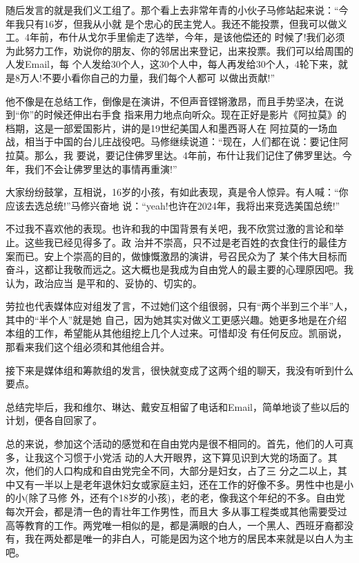 ﻿\documentclass[11pt]{article}
\begin{document}
随后发言的就是我们义工组了。那个看上去非常年青的小伙子马修站起来说：``今年我只有16岁，但我从小就
是个忠心的民主党人。我还不能投票，但我可以做义工。4年前，布什从戈尔手里偷走了选举，今年，是该他偿还的
时候了!我们必须为此努力工作，劝说你的朋友、你的邻居出来登记，出来投票。我们可以给周围的人发Email，每
个人发给30个人，这30个人中，每人再发给30个人，4轮下来，就是8万人!不要小看你自己的力量，我们每个人都可
以做出贡献!''

他不像是在总结工作，倒像是在演讲，不但声音铿锵激昂，而且手势坚决，在说到``你''的时候还伸出右手食
指来用力地点向听众。现在正好是影片《阿拉莫》的档期，这是一部爱国影片，讲的是19世纪美国人和墨西哥人在
阿拉莫的一场血战，相当于中国的台儿庄战役吧。马修继续说道：``现在，人们都在说：要记住阿拉莫。那么，我
要说，要记住佛罗里达。4年前，布什让我们记住了佛罗里达。今年，我们不会让佛罗里达的事情再重演!''

大家纷纷鼓掌，互相说，16岁的小孩，有如此表现，真是令人惊异。有人喊：``你应该去选总统!''马修兴奋地
说：``yeah!也许在2024年，我将出来竞选美国总统!''

不过我不喜欢他的表现。也许和我的中国背景有关吧，我不欣赏过激的言论和举止。这些我已经见得多了。政
治并不崇高，只不过是老百姓的衣食住行的最佳方案而已。安上个崇高的目的，做慷慨激昂的演讲，号召民众为了
某个伟大目标而奋斗，这都让我敬而远之。这大概也是我成为自由党人的最主要的心理原因吧。我认为，政治应当
是平和的、妥协的、切实的。

劳拉也代表媒体应对组发了言，不过她们这个组很弱，只有``两个半到三个半''人，其中的``半个人''就是她
自己，因为她其实对做义工更感兴趣。她更多地是在介绍本组的工作，希望能从其他组挖上几个人过来。可惜却没
有任何反应。凯丽说，那看来我们这个组必须和其他组合并。

接下来是媒体组和筹款组的发言，很快就变成了这两个组的聊天，我没有听到什么要点。

总结完毕后，我和维尔、琳达、戴安互相留了电话和Email，简单地谈了些以后的计划，便各自回家了。

总的来说，参加这个活动的感觉和在自由党内是很不相同的。首先，他们的人可真多，让我这个习惯于小党活
动的人大开眼界，这下算见识到大党的场面了。其次，他们的人口构成和自由党完全不同，大部分是妇女，占了三
分之二以上，其中又有一半以上是老年退休妇女或家庭主妇，还在工作的好像不多。男性中也是小的小(除了马修
外，还有个18岁的小孩)，老的老，像我这个年纪的不多。自由党每次开会，都是清一色的青壮年工作男性，而且大
多从事工程类或其他需要受过高等教育的工作。两党唯一相似的是，都是满眼的白人，一个黑人、西班牙裔都没
有，我在两处都是唯一的非白人，可能是因为这个地方的居民本来就是以白人为主吧。
\end{document}
